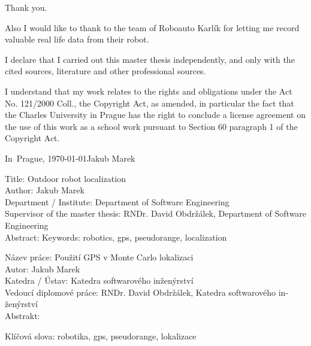 
\vspace{10mm} 

Thank you.

Also I would like to thank to the team of Roboauto Karlík for letting me
record valuable real life data from their robot.

\newpage

\vspace*{\fill}
I declare that I carried out this master thesis independently, and only with the cited
sources, literature and other professional sources.

I understand that my work relates to the rights and obligations under the Act No.
121/2000 Coll., the Copyright Act, as amended, in particular the fact that the Charles
University in Prague has the right to conclude a license agreement on the use of this
work as a school work pursuant to Section 60 paragraph 1 of the Copyright Act.

\vspace{10mm} 
\noindent In~Prague, \today\hspace{\fill}Jakub Marek\\
\newpage

\tableofcontents*
\newpage

\noindent
Title: Outdoor robot localization\\
Author: Jakub Marek\\
Department / Institute: Department of Software Engineering\\
Supervisor of the master thesis: RNDr. David Obdržálek, Department of Software Engineering\\

\noindent Abstract: 
\noindent Keywords: robotics, gps, pseudorange, localization

\vspace{25mm}

\begin{otherlanguage}{czech}
\noindent
Název práce: Použití GPS v Monte Carlo lokalizaci\\
Autor: Jakub Marek\\
Katedra / Ústav: Katedra softwarového inženýrství\\
Vedoucí diplomové práce: RNDr. David Obdržálek, Katedra softwarového inženýrství\\

\noindent Abstrakt: 

\noindent Klíčová slova: robotika, gps, pseudorange, lokalizace
\end{otherlanguage}

\newpage

